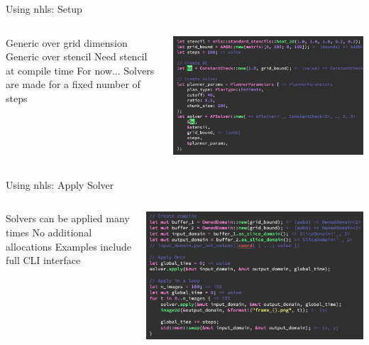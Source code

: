 \begin{frame}{Using nhls: Setup}
  \begin{columns}
  \begin{outline}
  \1 Generic over grid dimension 
  \1 Generic over stencil
  \1 Need stencil at compile time
  \2 For now...
  \1 Solvers are made for a fixed number of steps
  \end{outline}

  \begin{center}
  \centering
  \includegraphics[width=\textwidth]{nhls_setup.png}
  \end{center}
\end{columns}
\end{frame}

\begin{frame}{Using nhls: Apply Solver}
  \begin{columns}
  \begin{outline}
  \1 Solvers can be applied many times 
  \1 No additional allocations 
  \1 Examples include full CLI interface
  \end{outline}

  \begin{center}
  \centering
  \includegraphics[width=\textwidth]{nhls_solver.png}
  \end{center}
\end{columns}
\end{frame}

